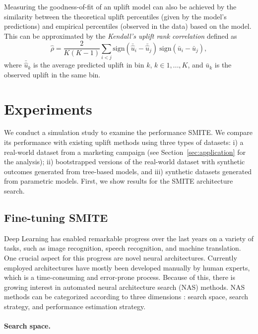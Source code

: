 \documentclass{article}
\begin{document}
Measuring the goodness-of-fit of an uplift model can also be achieved by the similarity between the theoretical uplift percentiles (given by the model's predictions) and empirical percentiles (observed in the data) based on the model. This can be approximated by the {\it Kendall's uplift rank correlation} \citep{belba2019qbased} defined as
\begin{equation}
    \hat{\rho} = \frac{2}{K(K-1)} \sum_{i<j} \mathrm{sign}(\bar{\hat{u}}_i - \bar{\hat{u}}_j)~\mathrm{sign}(\bar{u}_i - \bar{u}_j),
    \label{eq:corr_coeff}
\end{equation}
where $\bar{\hat{u}}_k$ is the average predicted uplift in bin $k$,  $k \in {1,...,K}$, and $\bar{u}_k$ is the observed uplift in the same bin. 




\section{Experiments}
\label{sec:experiments}

We conduct a simulation study to examine the performance SMITE. We compare its performance with existing uplift methods using three types of datasets: i) a real-world dataset from a marketing campaign (see Section~\ref{sec:application} for the analysis); ii) bootstrapped versions of the real-world dataset with synthetic outcomes generated from tree-based models, and iii) synthetic datasets generated from parametric models. First, we show results for the SMITE architecture search.

\subsection{Fine-tuning SMITE}

Deep Learning has enabled remarkable progress over the last years on a variety of tasks, such as image recognition, speech recognition, and machine translation. One crucial aspect
for this progress are novel neural architectures. Currently employed architectures have mostly been developed manually by human experts, which is a time-consuming and error-prone process. Because of this, there is growing interest in automated neural architecture search (NAS) methods. NAS methods can be categorized according to three dimensions \citep{elsken2018neural}: search space, search strategy, and performance estimation strategy.

\paragraph{Search space.}
\end{document}
